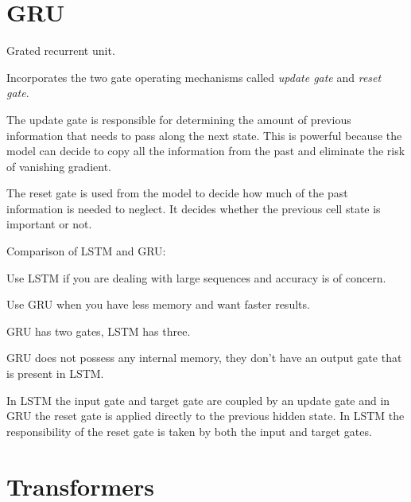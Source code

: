 	\section{GRU}
	\begin{bulletedlist}
		\item Grated recurrent unit.
		\item Incorporates the two gate operating mechanisms called \textit{update gate} and \textit{reset gate}.
		\item The update gate is responsible for determining the amount of previous information that needs to pass along the next state.  This is powerful because the model can decide to copy all the information from the past and eliminate the risk of vanishing gradient.
		\item The reset gate is used from the model to decide how much of the past information is needed to neglect.  It decides whether the previous cell state is important or not.
	\end{bulletedlist}

Comparison of LSTM and GRU:
	\begin{bulletedlist}
		\item Use LSTM if you are dealing with large sequences and accuracy is of concern.
		\item Use GRU when you have less memory and want faster results.
		\item GRU has two gates, LSTM has three.
		\item GRU does not possess any internal memory, they don't have an output gate that is present in LSTM.
		\item In LSTM the input gate and target gate are coupled by an update gate and in GRU the reset gate is applied directly to the previous hidden state.  In LSTM the responsibility of the reset gate is taken by both the input and target gates.
	\end{bulletedlist}

	\section{Transformers}

